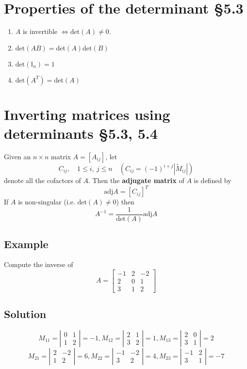 \documentclass[11pt]{article}
\begin{document}
\section{Properties of the determinant §5.3}
\begin{enumerate}[ (a) ]
\item $A$ is invertible $\Leftrightarrow \text{det}(A) \not = 0$.
\item $\text{det}(AB)=\text{det}(A)\text{det}(B)$
\item $\text{det}(\mathbb{I}_n) = 1$
\item $\text{det}(A^T) = \text{det}(A)$
\end{enumerate}

\section{Inverting matrices using determinants §5.3, 5.4}
Given an $n \times n$ matrix $A = [ A_{ij} ]$, let
\[ C_{ij}, \quad 1 \leq i,\ j \leq n \quad (C_{ij} = (-1)^{i+j} |\tilde{M}_{ij}| )\]
denote all the cofactors of $A$. Then the \textbf{adjugate matrix} of $A$ is defined by
\[ \text{adj}A = [C_{ij}]^T \]
If $A$ is non-singular (i.e. $\text{det}(A) \not = 0$) then
\[ A^{-1} = \frac{1}{\text{det}(A)} \text{adj}A \]

\subsection{Example}
Compute the inverse of
\[
A = 
\begin{bmatrix}
-1 & 2 & -2 \\
2 & 0 & 1 \\
3 & 1 & 2
\end{bmatrix}
\]

\subsection{Solution}
\[ 
M_{11} = \left| \begin{matrix}
0 & 1 \\
1 & 2
\end{matrix} \right|
= - 1,
M_{12} = \left| \begin{matrix}
2 & 1 \\
3 & 2
\end{matrix} \right|
= 1,
M_{13} = \left| \begin{matrix}
2 & 0 \\
3 & 1
\end{matrix} \right|
= 2
\]
\[
M_{21} = \left| \begin{matrix}
2 & -2 \\
1 & 2
\end{matrix} \right|
= 6,
M_{22} = \left| \begin{matrix}
-1 & -2 \\
3 & 2
\end{matrix} \right|
= 4,
M_{23} = \left| \begin{matrix}
-1 & 2 \\
3 & 1
\end{matrix} \right|
= -7
\]
\end{document}
